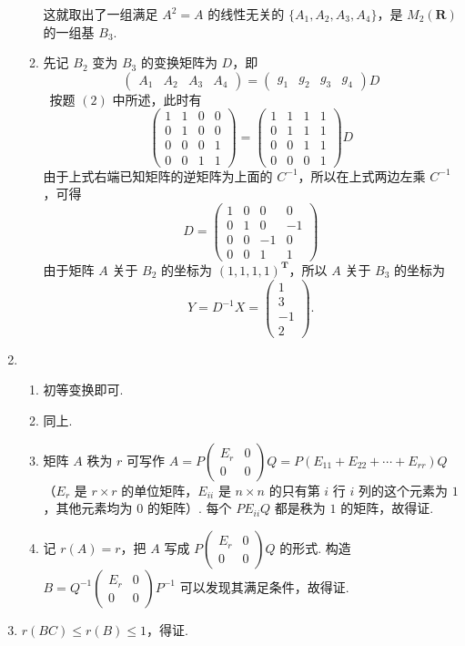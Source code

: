 \begin{enumerate}
\begin{enumerate}
        这就取出了一组满足 $A^2=A$ 的线性无关的 $\{A_1,A_2,A_3,A_4\}$，是 $M_2(\mathbf{R})$ 的一组基 $B_3$.
        \item 先记 $B_2$ 变为 $B_3$ 的变换矩阵为 $D$，即 \[\begin{pmatrix}A_1 & A_2 & A_3 & A_4\end{pmatrix}=\begin{pmatrix}g_1 & g_2 & g_3 & g_4\end{pmatrix}D\]\
        按题 $(2)$ 中所述，此时有 \[\begin{pmatrix}1 & 1 & 0 & 0 \\ 0 & 1 & 0 & 0 \\ 0 & 0 & 0 & 1 \\ 0 & 0 & 1 & 1\end{pmatrix}=\begin{pmatrix}1 & 1 & 1 & 1 \\ 0 & 1 & 1 & 1 \\ 0 & 0 & 1 & 1 \\ 0 & 0 & 0 & 1\end{pmatrix}D\]
        由于上式右端已知矩阵的逆矩阵为上面的 $C^{-1}$，所以在上式两边左乘 $C^{-1}$，可得 \[D = \begin{pmatrix}1 & 0 & 0 & 0 \\ 0 & 1 & 0 & -1 \\ 0 & 0 & -1 & 0 \\ 0 & 0 & 1 & 1\end{pmatrix}\]
        由于矩阵 $A$ 关于 $B_2$ 的坐标为 $(1,1,1,1)^{\mathbf{T}}$，所以 $A$ 关于 $B_3$ 的坐标为
        \[Y=D^{-1}X=\begin{pmatrix}1 \\ 3 \\ -1 \\ 2\end{pmatrix}.\]
    \end{enumerate}
    \item \begin{enumerate}
        \item 初等变换即可.
        \item 同上.
        \item 矩阵 $A$ 秩为 $r$ 可写作 $A=P\begin{pmatrix}E_r & 0 \\ 0 & 0\end{pmatrix}Q = P(E_{11}+E_{22}+\cdots+E_{rr})Q$（$E_r$ 是 $r\times r$ 的单位矩阵，$E_{ii}$ 是 $n\times n$ 的只有第 $i$ 行 $i$ 列的这个元素为 $1$，其他元素均为 $0$ 的矩阵）. 
        每个 $PE_{ii}Q$ 都是秩为 $1$ 的矩阵，故得证.
        \item 记 $r(A)=r$，把 $A$ 写成 $P\begin{pmatrix}E_r & 0 \\ 0 & 0\end{pmatrix}Q$ 的形式. 构造 $B=Q^{-1}\begin{pmatrix}E_r & 0 \\ 0 & 0\end{pmatrix}P^{-1}$ 可以发现其满足条件，故得证.
    \end{enumerate}
    \item $r(BC)\leq r(B) \leq 1$，得证. 
    

\end{enumerate}
